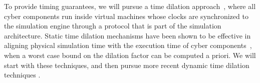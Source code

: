 To provide timing guarantees, we will pursue a time dilation approach~\cite{Goodfellow2015Cypress:Systems}, where all cyber components run inside virtual machines whose clocks are synchronized to the simulation engine through a protocol that is part of the simulation architecture. Static time dilation mechanisms have been shown to be effective in aligning physical simulation time with the execution time of cyber components~\cite{Gupta2011DieCast}, when a worst case bound on the dilation factor can be computed a priori. We will start with these techniques, and then pursue more recent dynamic time dilation techniques \cite{Lee2014IntegratedDilation}.



